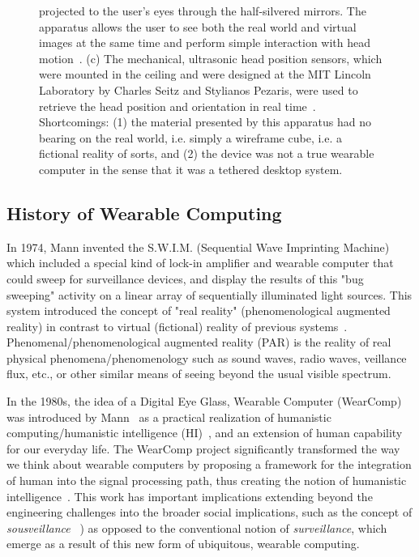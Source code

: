 \begin{figure}[t]
{projected to the user's eyes through the half-silvered mirrors. The apparatus allows the user to see 
both the real world and virtual images at the same time and perform simple interaction with head 
motion~\cite{sutherland1968head}. (c) The mechanical, ultrasonic head position sensors, which were mounted in the ceiling and 
were designed at the MIT Lincoln Laboratory by Charles Seitz and Stylianos Pezaris, were used to 
retrieve the head position and orientation in real time~\cite{sutherland1968head}.  Shortcomings: (1) the material presented by this apparatus had no bearing on the real world, i.e. simply a wireframe cube, i.e. a fictional reality of sorts, and (2) the device was not a true wearable computer in the sense that it was a tethered desktop system.}
\label{ivanfullsetup}
\end{figure}

\subsection{History of Wearable Computing}
In 1974, Mann invented the S.W.I.M. (Sequential Wave Imprinting Machine) which included a special kind of lock-in amplifier and wearable computer that could sweep for surveillance devices, and display the results of this "bug sweeping" activity on a linear array of sequentially illuminated light sources\cite{mann1992wavelets, impulse, mann2014sightfield, kineveillance}.  This system introduced the concept of "real reality" (phenomenological augmented reality) in contrast to virtual (fictional) reality of previous systems~\cite{mann2015par}.  Phenomenal/phenomenological augmented reality (PAR) is the reality of real physical phenomena/phenomenology such as sound waves, radio waves, veillance flux, etc., or other similar means of seeing beyond the usual visible spectrum.

In the 1980s, the idea of a Digital Eye Glass, Wearable Computer (WearComp) was introduced by 
Mann~\cite{mannaaai361, mann1994mediated, mannwyckofftr, aimone2003eyetap} as a 
practical realization of humanistic computing/humanistic intelligence (HI)~\cite{mann2001wearable, 
intelligentimageprocessing,presenceconnect,mann260}, and an extension of human capability for our 
everyday life. The WearComp project significantly transformed the way we think about wearable 
computers by proposing a framework for the integration of human into the signal processing path, 
thus creating the notion of humanistic intelligence~\cite{mann2001wearable, 
intelligentimageprocessing}. This work has important implications extending beyond the engineering 
challenges into the broader social implications, such as the concept of \emph{sousveillance}
~\cite{mann2002sousveillance, mann2004sousveillance, mann2006cyborglogging}) as opposed to 
the conventional notion of \emph{surveillance}, which emerge as a result of this new form of 
ubiquitous, wearable computing. 

